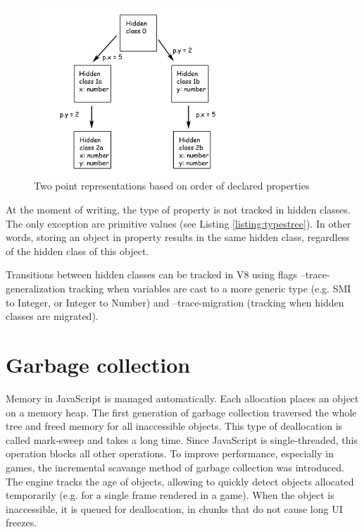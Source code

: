 \begin{figure}[h!]
  \caption{Two point representations based on order of declared properties}
  \label{img:point_tree2}
  \centering
	\includegraphics[width=8cm]{point_tree2}
\end{figure} 

At the moment of writing, the type of property is not tracked in hidden classes. The only exception are primitive values (see Listing \ref{listing:typestree}). In other words, storing an object in property results in the same hidden class, regardless of the hidden class of this object.

Transitions between hidden classes can be tracked in V8 using flags --trace-generalization tracking when variables are cast to a more generic type (e.g. SMI to Integer, or Integer to Number) and --trace-migration (tracking when hidden classes are migrated).



\section{Garbage collection}
\label{sec:garbagecollection}

Memory in JavaScript is managed automatically. Each allocation places an object on a memory heap. The first generation of garbage collection traversed the whole tree and freed memory for all inaccessible objects. This type of deallocation is called mark-sweep and takes a long time. Since JavaScript is single-threaded, this operation blocks all other operations. To improve performance, especially in games, the incremental scavange method of garbage collection was introduced. The engine tracks the age of objects, allowing to quickly detect objects allocated temporarily (e.g. for a single frame rendered in a game). When the object is inaccessible, it is queued for deallocation, in chunks that do not cause long UI freezes.\cite{cheneys-algorithm,garbage-collection}



